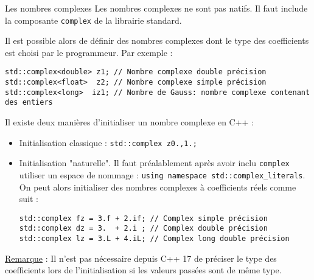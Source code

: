 \documentclass[compress,10pt,aspectratio=169]{beamer}
\begin{document}
\begin{frame}[fragile]{Les nombres complexes}
\scriptsize
Les nombres complexes ne sont pas natifs. Il faut include la composante \texttt{complex} de la librairie standard.

Il est possible alors de définir des nombres complexes dont le type des coefficients est choisi par le programmeur. Par
exemple :
\begin{verbatim}
std::complex<double> z1; // Nombre complexe double précision 
std::complex<float>  z2; // Nombre complexe simple précision
std::complex<long>  iz1; // Nombre de Gauss: nombre complexe contenant des entiers
\end{verbatim}

Il existe deux manières d'initialiser un nombre complexe en C++ :
\begin{itemize}
\item Initialisation classique : \texttt{std::complex z{0.,1.};}
\item Initialisation "naturelle". Il faut préalablement après avoir inclu \texttt{complex} utiliser un espace de nommage :
\texttt{using namespace std::complex_literals}. On peut alors initialiser des nombres complexes à coefficients réels comme suit :
\begin{verbatim}
std::complex fz = 3.f + 2.if; // Complex simple précision
std::complex dz = 3.  + 2.i ; // Complex double précision
std::complex lz = 3.L + 4.iL; // Complex long double précision
\end{verbatim}
\end{itemize}
\underline{Remarque} : Il n'est pas nécessaire depuis C++ 17 de préciser le type des coefficients lors de l'initialisation si les valeurs passées sont de même type.
\end{frame}
\end{document}
